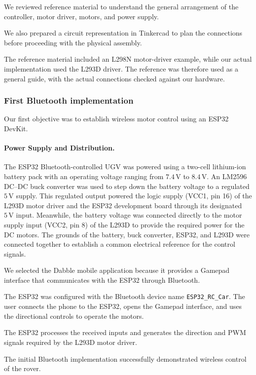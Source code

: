 \documentclass[11pt,a4paper]{article}
\begin{document}
We reviewed reference material to understand the
general arrangement of the controller, motor driver,
motors, and power supply.

We also prepared a circuit representation in Tinkercad
to plan the connections before proceeding with the
physical assembly.

The reference material included an L298N motor-driver
example, while our actual implementation used the
L293D driver. The reference was therefore used as a
general guide, with the actual connections checked
against our hardware.


\subsubsection{First Bluetooth implementation}

Our first objective was to establish wireless motor
control using an ESP32 DevKit.

\paragraph{Power Supply and Distribution.}
The ESP32 Bluetooth-controlled UGV was powered using a two-cell lithium-ion battery pack with an operating voltage ranging from \(7.4\,\mathrm{V}\) to \(8.4\,\mathrm{V}\). An LM2596 DC--DC buck converter was used to step down the battery voltage to a regulated \(5\,\mathrm{V}\) supply. This regulated output powered the logic supply (VCC1, pin 16) of the L293D motor driver and the ESP32 development board through its designated \(5\,\mathrm{V}\) input. Meanwhile, the battery voltage was connected directly to the motor supply input (VCC2, pin 8) of the L293D to provide the required power for the DC motors. The grounds of the battery, buck converter, ESP32, and L293D were connected together to establish a common electrical reference for the control signals.

We selected the Dabble mobile application because it
provides a Gamepad interface that communicates with
the ESP32 through Bluetooth.

The ESP32 was configured with the Bluetooth device
name \texttt{ESP32\_RC\_Car}. The user connects the
phone to the ESP32, opens the Gamepad interface, and
uses the directional controls to operate the motors.

The ESP32 processes the received inputs and generates
the direction and PWM signals required by the L293D
motor driver.

The initial Bluetooth implementation successfully
demonstrated wireless control of the rover.
\end{document}
